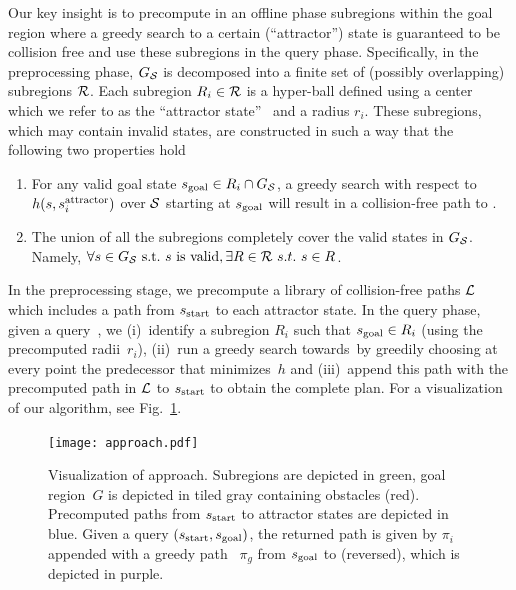 \documentclass[a4paper,10pt]{article}
\begin{document}
Our key insight is to precompute in an offline phase subregions within the goal region where a greedy search to a certain (``attractor'') state is guaranteed to be collision free and use these subregions in the query phase.
Specifically, in the preprocessing phase, $G_\mathcal{S}$ is decomposed into a finite  set of (possibly overlapping) subregions $\mathcal{R}$.
Each subregion $R_i \in \mathcal{R}$ is a hyper-ball defined using a center which we refer to as the ``attractor state''~
\sAttract and a radius $r_i$.
These subregions, which may contain invalid states, are constructed in such a way that the following two properties hold
\begin{enumerate}[label={\textbf{P\arabic*}}]
  \item \label{property:1} For any valid goal state $s_{\text{goal}} \in R_i \cap G_\mathcal{S}$, a greedy search with respect to $h(s, s^{\text{attractor}}_i)$ over $\mathcal{S}$ starting at $s_{\text{goal}}$ will result in a collision-free path to \sAttract.
  \item \label{property:2} The union of all the subregions completely cover the valid states in $G_\mathcal{S}$. 
      Namely, $\forall s \in G_\mathcal{S}~\text{s.t.}~s~\text{is valid}, \exists R \in \mathcal{R} \ s.t. \ s \in R$.
\end{enumerate}

In the preprocessing stage, we precompute a library of collision-free paths $\mathcal{L}$ which includes a path from $s_{\textrm{start}}$ to each attractor state. 
In the query phase, given a query~\sGoal, we 
(i)~identify a subregion $R_i$ such that $s_{\text{goal}} \in R_i$ (using the precomputed radii~$r_i$),
(ii)~run a greedy search towards~\sAttract by greedily choosing at every point the predecessor that minimizes~$h$ and
(iii)~append this path with the precomputed path in $\mathcal{L}$ to $s_{\textrm{start}}$ to obtain the complete plan.
For a visualization of our algorithm, see Fig.~\ref{fig:approach}.


\begin{figure}
\centering
\texttt{[image: approach.pdf]}
  \caption{
  Visualization of approach. Subregions are depicted in green, 
  goal region~$G$ is depicted in tiled gray  containing obstacles (red).
  Precomputed paths from $s_{\rm{start}}$ to attractor states are depicted in blue.
 Given a query $(s_{\rm{start}}, s_{\rm{goal}})$, the returned path is given by $\pi_i$ appended with a greedy path ~$\pi_g$ from $s_{\rm{goal}}$ to \sAttract (reversed), which is depicted in purple.
}
    \label{fig:approach}
\end{figure}
\end{document}
